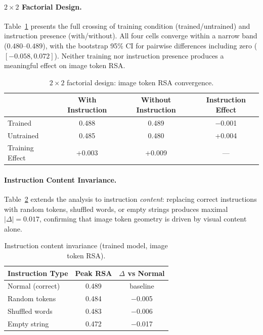 \documentclass[10pt,letterpaper]{article}
\begin{document}
\paragraph{$2 \times 2$ Factorial Design.}
Table~\ref{tab:factorial} presents the full crossing of training condition (trained/untrained) and instruction presence (with/without). All four cells converge within a narrow band ($0.480$--$0.489$), with the bootstrap 95\% CI for pairwise differences including zero ($[-0.058, 0.072]$). Neither training nor instruction presence produces a meaningful effect on image token RSA.

\begin{table}[h]
\centering
\caption{$2 \times 2$ factorial design: image token RSA convergence.}
\label{tab:factorial}
\begin{tabular}{lccc}
\toprule
& With Instruction & Without Instruction & Instruction Effect \\
\midrule
Trained & 0.488 & 0.489 & $-$0.001 \\
Untrained & 0.485 & 0.480 & +0.004 \\
\midrule
Training Effect & +0.003 & +0.009 & --- \\
\bottomrule
\end{tabular}
\end{table}

\paragraph{Instruction Content Invariance.}
Table~\ref{tab:content_inv} extends the analysis to instruction \emph{content}: replacing correct instructions with random tokens, shuffled words, or empty strings produces maximal $|\Delta| = 0.017$, confirming that image token geometry is driven by visual content alone.

\begin{table}[h]
\centering
\caption{Instruction content invariance (trained model, image token RSA).}
\label{tab:content_inv}
\begin{tabular}{lcc}
\toprule
Instruction Type & Peak RSA & $\Delta$ vs Normal \\
\midrule
Normal (correct) & 0.489 & baseline \\
Random tokens & 0.484 & $-$0.005 \\
Shuffled words & 0.483 & $-$0.006 \\
Empty string & 0.472 & $-$0.017 \\
\bottomrule
\end{tabular}
\end{table}
\end{document}
